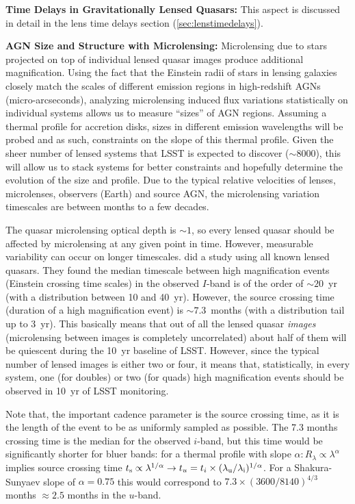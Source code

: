 {\bf Time Delays in Gravitationally Lensed Quasars:} This aspect is discussed in detail in the
lens time delays section (\autoref{sec:lenstimedelays}).

{\bf AGN Size and Structure with Microlensing:} Microlensing due to stars projected on top of individual lensed quasar images produce additional magnification. Using the fact that the Einstein radii of stars in lensing galaxies closely match the scales of different emission regions in high-redshift AGNs (micro-arcseconds), analyzing microlensing induced flux variations statistically on individual systems allows us to measure ``sizes'' of AGN regions.
%
Assuming a thermal profile for accretion disks, sizes in different emission wavelengths will be probed and as such, constraints on the slope of this thermal profile. Given the sheer number of lensed systems that LSST is expected to discover ($\sim8000$), this will allow us to stack systems for better constraints and hopefully determine the evolution of the size and profile. Due to the typical relative velocities of lenses, microlenses, observers (Earth) and source AGN, the microlensing variation timescales are between months to a few decades.

The quasar microlensing optical depth is $\sim1$, so every lensed quasar should be affected by microlensing at any given point in time. However, measurable variability can occur on longer timescales. \citet{MosqueraandKochanek2011} did a study using all known lensed quasars. They found the median timescale between high magnification events (Einstein crossing time scales) in the observed $I$-band is of the order of $\sim20$~yr (with a distribution between 10 and 40~yr). However, the source crossing time (duration of a high magnification event) is $\sim7.3$~months (with a distribution tail up to 3~yr). This basically means that out of all the lensed quasar {\em images} (microlensing between images is completely uncorrelated) about half of them will be quiescent during the 10~yr baseline of LSST. However, since the typical number of lensed images is either two or four, it means that, statistically, in every system, one (for doubles) or two (for quads) high magnification events should be observed in 10~yr of LSST monitoring.

Note that, the important cadence parameter is the source crossing time, as it is the length of the event to be as uniformly sampled as possible. The 7.3 months crossing time is the median for the observed $i$-band, but this time would be significantly shorter for bluer bands: for a thermal profile with slope $\alpha: R_\lambda \propto \lambda^\alpha$ implies source crossing time $t_{\rm s} \propto \lambda^{1/\alpha} \rightarrow t_u=t_i \times (\lambda_{\rm u} / \lambda_{\rm i})^{1/\alpha}$. For a Shakura-Sunyaev slope of $\alpha=0.75$ this would correspond to $7.3 \times (3600/8140)^{4/3}$ months $\approx 2.5$ months in the $u$-band.

